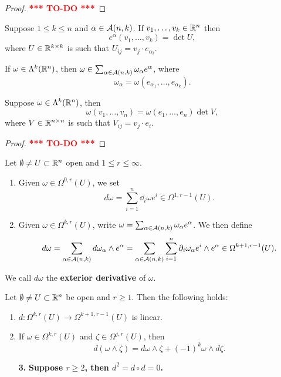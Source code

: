 \documentclass[a4paper]{article}
\newcommand{\TODO}{\textcolor{red}{\textbf{*** TO-DO ***}}}
\begin{document}
\begin{proof}
\TODO
\end{proof}

\begin{cor}
Suppose $1 \leq k \leq n$ and $\alpha \in \mathcal{A}(n, k)$. 
If $v_1, \dots, v_k \in \mathbb{R}^n$ then 
\[
e^\alpha (v_1, \dots, v_k) = \det U,
\]
where $U \in \mathbb{R}^{k \times k}$ is such that 
$U_{ij} = v_j \cdot e_{\alpha_i}$.
\end{cor}

\begin{cor}
If $\omega \in \Lambda^k(\mathbb{R}^n)$, then $\omega \in \sum_{\alpha 
\in \mathcal{A}(n, k)} \omega_\alpha e^\alpha$, where 
\[
\omega_\alpha = \omega(e_{\alpha_1}, \dots, e_{\alpha_k}).
\]
\end{cor}

\begin{prop}
Suppose $\omega \in \Lambda^k(\mathbb{R}^n)$, then 
\[
\omega(v_1, \dots, v_n) = \omega(e_1, \dots, e_n) \det V,
\]
where $V \in \mathbb{R}^{n \times n}$ is such that 
$V_{ij} = v_j \cdot e_i$.
\end{prop}

\begin{proof}
\TODO
\end{proof}

\begin{defi}
Let $\emptyset \neq U \subset \mathbb{R}^n$ open and $1 \leq r \leq 
\infty$. 
\begin{enumerate}
\item Given $\omega \in \Omega^{0, r}(U)$, we set 
\[
d \omega = \sum_{i=1}^n \dd_i \omega e^i \in \Omega^{1, r-1}
(U).
\]
\item Given $\omega \in \Omega^{k, r}(U)$, write 
$\omega = \sum_{\alpha \in \mathcal{A}(n, k)} \omega_\alpha 
e^\alpha$. We then define 
\[
d \omega
= \sum_{\alpha \in \mathcal{A}(n, k)} d \omega_\alpha \wedge 
e^\alpha 
= \sum_{\alpha \in \mathcal{A}(n, k)} \sum_{i=1}^n 
\partial_i \omega_\alpha e^i \wedge e^\alpha 
\in \Omega^{k+1, r-1}(U).
\]
\end{enumerate}
We call $d \omega$ the \textbf{exterior derivative} of $\omega$.
\end{defi}

\begin{thm}
Let $\emptyset \neq U \subset \mathbb{R}^n$ be open and $r \geq 1$. 
Then the following holds: 
\begin{enumerate}
\item $d : \Omega^{k, r}(U) \to \Omega^{k+1, r-1} (U)$
is linear. 
\item If $\omega \in \Omega^{k, r}(U)$ and 
$\zeta \in \Omega^{j, r} (U)$, then 
\[
d (\omega \wedge \zeta) = d \omega \wedge \zeta 
+ (-1)^k \omega \wedge d \zeta.
\]
\item[\textbf{3.}] 
\textbf{Suppose $r \geq 2$, then $d^2 = d \circ d = 0$.}
\end{enumerate}
\end{thm}
\end{document}
